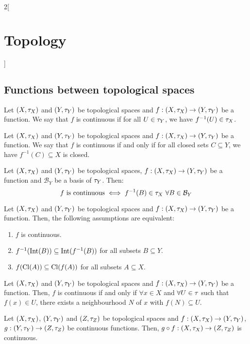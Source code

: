 \documentclass[../../../main.tex]{subfiles}
\begin{document}
\begin{multicols}{2}[\section{Topology}]
  \subsection{Functions between topological spaces}
  \begin{definition}
    Let $(X,\tau_X)$ and $(Y,\tau_Y)$ be topological spaces and $f:(X,\tau_X)\rightarrow(Y,\tau_Y)$ be a function. We say that $f$ is continuous if for all $U\in\tau_Y$, we have $f^{-1}(U)\in\tau_X$.
  \end{definition}
  \begin{prop}
    Let $(X,\tau_X)$ and $(Y,\tau_Y)$ be topological spaces and $f:(X,\tau_X)\rightarrow(Y,\tau_Y)$ be a function. We say that $f$ is continuous if and only if for all closed sets $C\subseteq Y$, we have $f^{-1}(C)\subseteq X$ is closed.
  \end{prop}
  \begin{theorem}
    Let $(X,\tau_X)$ and $(Y,\tau_Y)$ be topological spaces, $f:(X,\tau_X)\rightarrow (Y,\tau_Y)$ be a function and $\mathcal{B}_Y$ be a basis of $\tau_Y$. Then: $$f\text{ is continuous}\iff f^{-1}(B)\in\topo_X\ \forall B\in \mathcal{B}_Y$$
  \end{theorem}
  \begin{theorem}
    Let $(X,\tau_X)$ and $(Y,\tau_Y)$ be topological spaces and $f:(X,\tau_X)\rightarrow (Y,\tau_Y)$ be a function. Then, the following assumptions are equivalent:
    \begin{enumerate}
      \item $f$ is continuous.
      \item $f^{-1}(\operatorname{Int}(B))\subseteq \operatorname{Int}(f^{-1}(B))$ for all subsets $B\subseteq Y$.
      \item $f(\operatorname{Cl}(A))\subseteq \operatorname{Cl}(f(A))$ for all subsets $A\subseteq X$.
    \end{enumerate}
  \end{theorem}
  \begin{theorem}
    Let $(X,\tau_X)$ and $(Y,\tau_Y)$ be topological spaces and $f:(X,\tau_X)\rightarrow (Y,\tau_Y)$ be a function. Then, $f$ is continuous if and only if $\forall x\in X$ and $\forall U\in\tau$ such that $f(x)\in U$, there exists a neighbourhood $N$ of $x$ with $f(N)\subseteq U$.
  \end{theorem}
  \begin{prop}
    Let $(X,\tau_X)$, $(Y,\tau_Y)$ and $(Z,\tau_Z)$ be topological spaces and $f:(X,\tau_X)\rightarrow (Y,\tau_Y)$, $g:(Y,\tau_Y)\rightarrow (Z,\tau_Z)$ be continuous functions. Then, $g\circ f:(X,\tau_X)\rightarrow (Z,\tau_Z)$ is continuous.

\end{prop}
\end{multicols}
\end{document}
